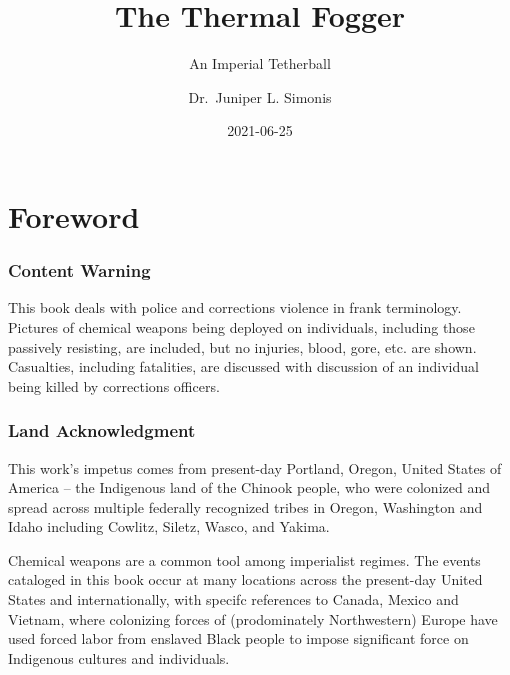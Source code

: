 \documentclass[
  12pt,
]{krantz}
\title{The Thermal Fogger}
\subtitle{An Imperial Tetherball}
\author{Dr.~Juniper L. Simonis}
\date{2021-06-25}
\begin{document}
\maketitle


\setlength{\abovedisplayskip}{-5pt}
\setlength{\abovedisplayshortskip}{-5pt}

{
\hypersetup{linkcolor=}
\setcounter{tocdepth}{2}
\tableofcontents
}
\listoffigures
\listoftables


\hypertarget{foreword}{%
\chapter*{Foreword}\label{foreword}}


\hypertarget{content-warning}{%
\subsection*{Content Warning}\label{content-warning}}


This book deals with police and corrections violence in frank terminology.
Pictures of chemical weapons being deployed on individuals, including those passively resisting, are included, but no injuries, blood, gore, etc. are shown.
Casualties, including fatalities, are discussed with discussion of an individual being killed by corrections officers.

\hypertarget{land-acknowledgment}{%
\subsection*{Land Acknowledgment}\label{land-acknowledgment}}


This work's impetus comes from present-day Portland, Oregon, United States of America -- the Indigenous land of the Chinook people, who were colonized and spread across multiple federally recognized tribes in Oregon, Washington and Idaho including Cowlitz, Siletz, Wasco, and Yakima.

Chemical weapons are a common tool among imperialist regimes.
The events cataloged in this book occur at many locations across the present-day United States and internationally, with specifc references to Canada, Mexico and Vietnam, where colonizing forces of (prodominately Northwestern) Europe have used forced labor from enslaved Black people to impose significant force on Indigenous cultures and individuals.
\end{document}
